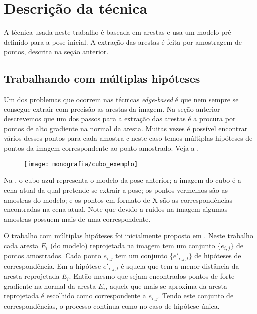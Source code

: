 \section{Descrição da técnica}

A técnica usada neste trabalho é baseada em arestas e usa um modelo pré-definido para a pose inicial. A extração das arestas é feita por amostragem de pontos, descrita na seção anterior.

\subsection{Trabalhando com múltiplas hipóteses}

Um dos problemas que ocorrem nas técnicas \emph{edge-based} é que nem sempre se consegue extrair com precisão as arestas da imagem. Na seção anterior descrevemos que um dos passos para a extração das arestas é a procura por pontos de alto gradiente na normal da aresta. Muitas vezes é possível encontrar vários desses pontos para cada amostra e neste caso temos múltiplas hipóteses de pontos da imagem correspondente ao ponto amostrado. Veja a .



\begin{figure}[ht!]
\centering
\texttt{[image: monografia/cubo\_exemplo]}
\caption{}
\label{cubo_0}
\end{figure}

Na , o cubo azul representa o modelo da pose anterior; a imagem do cubo é a cena atual da qual pretende-se extrair a pose; os pontos vermelhos são as amostras do modelo; e os pontos em formato de X são as correspondências encontradas na cena atual. Note que devido a ruídos na imagem algumas amostras possuem mais de uma correspondente.

O trabalho com múltiplas hipóteses foi inicialmente proposto em \cite{multiplas_hipoteses}. Neste trabalho cada aresta $E_i$ (do modelo) reprojetada na imagem tem um conjunto $\{e_{i,j}\}$ de pontos amostrados. Cada ponto $e_{i,j}$ tem um conjunto $\{e'_{i,j,l}\}$ de hipóteses de correspondência. Em \cite{multiplas_hipoteses} a hipótese $e'_{i,j,l}$ é aquela que tem a menor distância da aresta reprojetada $E_i$. Então mesmo que sejam encontrados pontos de forte gradiente na normal da aresta $E_i$, aquele que mais se aproxima da aresta reprojetada é escolhido como correspondente a $e_{i,j}$. Tendo este conjunto de correspondências, o processo continua como no caso de hipótese única.

